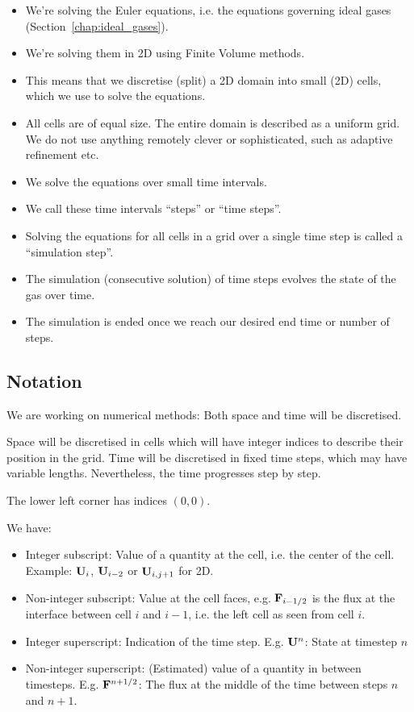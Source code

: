 \begin{itemize}
\item We're solving the Euler equations, i.e. the equations governing ideal
    gases (Section~\ref{chap:ideal_gases}).
\item We're solving them in 2D using Finite Volume methods.
\item This means that we discretise (split) a 2D domain into small (2D) cells,
    which we use to solve the equations.
\item All cells are of equal size. The entire domain is described as a uniform
    grid. We do not use anything remotely clever or sophisticated, such as
    adaptive refinement etc.
\item We solve the equations over small time intervals.
\item We call these time intervals ``steps'' or ``time steps''.
\item Solving the equations for all cells in a grid over a single time step is
    called a ``simulation step''.
\item The simulation (consecutive solution) of time steps evolves the state of
    the gas over time.
\item The simulation is ended once we reach our desired end time or number of
    steps.
\end{itemize}






\subsection{Notation}


We are working on numerical methods: Both space and time will be discretised.

Space will be discretised in cells which will have integer indices to describe
their position in the grid. Time will be discretised in fixed time steps, which
may have variable lengths. Nevertheless, the time progresses step by step.

The lower left corner has indices $(0, 0)$.




We have:
\begin{itemize}
    \item Integer subscript: Value of a quantity at the cell, i.e. the center
        of the cell. Example: $\mathbf{U}_i$, $\mathbf{U}_{i-2}$ or $\mathbf{U}_{i, j+1}$ for 2D.
    \item Non-integer subscript: Value at the cell faces, e.g. $\mathbf{F}_{i-1/2}$ is
        the flux at the interface between cell $i$ and $i-1$, i.e. the left
        cell as seen from cell $i$.
    \item Integer superscript: Indication of the time step. E.g. $\mathbf{U} ^ n$:
        State at timestep $n$
    \item Non-integer superscript: (Estimated) value of a quantity in between
        timesteps. E.g. $\mathbf{F}^{n + 1/2}$: The flux at the middle of the time
        between steps $n$ and $n + 1$.
\end{itemize}
